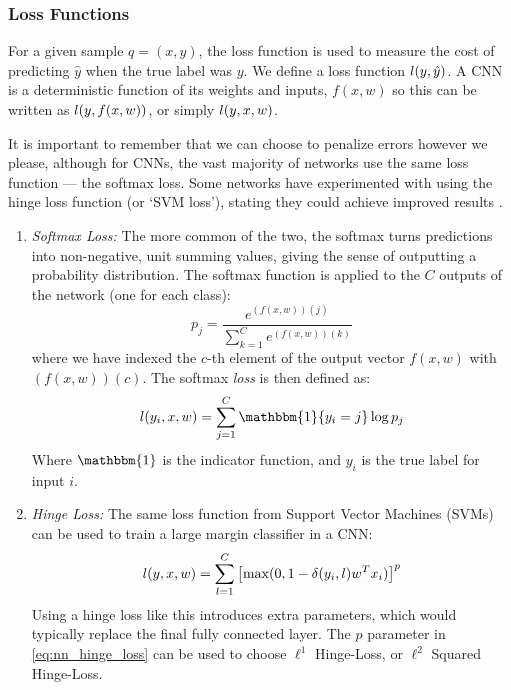\subsubsection{Loss Functions}
  For a given sample $q=(x, y)$, the loss
  function is used to measure the cost of predicting $\hat{y}$ when the
  true label was $y$. We define a loss function $l (y, \hat{y})$. 
  A CNN is a deterministic
  function of its weights and inputs, $f(x,w)$ so this can be written as $l
  (y, f(x,w))$, or simply $l(y, x, w)$.
  
  It is important to remember that we can choose
  to penalize errors however we please, although for CNNs, the vast majority of
  networks use the same loss function --- the softmax loss. Some networks have
  experimented with using the hinge loss function (or `SVM loss'), stating they
  could achieve improved results \citep{gu_recent_2015,tang_deep_2013}. 
  \begin{enumerate}

  \item \emph{Softmax Loss:} The more common of the two, the softmax turns
    predictions into non-negative, unit summing values, giving the sense of
    outputting a probability distribution. The softmax function is applied to
    the $C$ outputs of the network (one for each class):
    \begin{equation}
      p_j = \frac{e^{(f(x, w))(j)}}{\sum\limits_{k=1}^{C}e^{(f(x,w))(k)}}
    \end{equation}
    where we have indexed the $c$-th element of the output vector $f(x,w)$ with
      $(f(x,w))(c)$. The softmax \emph{loss} is then defined as:
    \begin{equation}
      \loss (y_i, x, w)
      = \sum_{j=1}^{C} \mathbbm{1}\{y_i=j\} \log p_j
    \end{equation}
    Where $\mathbbm{1}$ is the indicator function, and $y_i$ is the true label
    for input $i$.

  \item \emph{Hinge Loss:} The same loss function from Support Vector
    Machines (SVMs) can be used to train a large margin classifier in a CNN:
    \begin{equation}
      l(y,x,w) = \sum_{l=1}^{C} 
        {\left[ \max(0, 1 - \delta(y_i,l) w^{T}x_{i}) \right]}^p \label{eq:nn_hinge_loss}
    \end{equation}
    Using a hinge loss like this introduces extra parameters, which would
    typically replace the final fully connected layer. The $p$ parameter in
    \autoref{eq:nn_hinge_loss} can be used to choose $\ell^1$ Hinge-Loss, or
    $\ell^2$ Squared Hinge-Loss. 

  \end{enumerate}
  

